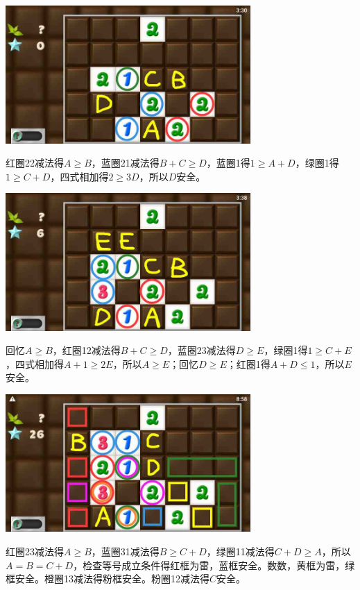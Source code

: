 \subsection{} %
\begin{center}
    \includegraphics[width=0.7\textwidth]{puzzlelow/233-1.jpg}
\end{center}
红圈22减法得$A\ge B$，蓝圈21减法得$B+C\ge D$，蓝圈1得$1\ge A+D$，绿圈1得$1\ge C+D$，四式相加得$2\ge 3D$，所以$D$安全。
\begin{center}
    \includegraphics[width=0.7\textwidth]{puzzlelow/233-2.jpg}
\end{center}
回忆$A\ge B$，红圈12减法得$B+C\ge D$，蓝圈23减法得$D\ge E$，绿圈1得$1\ge C+E$，四式相加得$A+1\ge 2E$，所以$A\ge E$；回忆$D\ge E$；红圈1得$A+D\le 1$，所以$E$安全。
\begin{center}
    \includegraphics[width=0.7\textwidth]{puzzlelow/233-3.jpg}
\end{center}
红圈23减法得$A\ge B$，蓝圈31减法得$B\ge C+D$，绿圈11减法得$C+D\ge A$，所以$A=B=C+D$，检查等号成立条件得红框为雷，蓝框安全。数数，黄框为雷，绿框安全。橙圈13减法得粉框安全。粉圈12减法得$C$安全。
